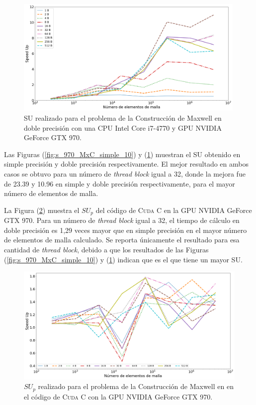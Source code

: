\begin{figure}[htbp]
	\centering
	\includegraphics[width=0.99\textwidth]{figs/cap4/s_970_MxC_double_10}
	\caption{SU realizado para el problema de la Construcción de Maxwell en doble precisión con una CPU Intel Core i7-4770 y GPU NVIDIA GeForce GTX 970.} 
	\label{fig:s_970_MxC_double_10}	
\end{figure}

\newpage

Las Figuras (\ref{fig:s_970_MxC_simple_10}) y (\ref{fig:s_970_MxC_double_10}) muestran el SU obtenido en simple precisión y doble precisión respectivamente. El mejor resultado en ambos casos se obtuvo para un número de \textit{thread block} igual a 32, donde la mejora fue de 23.39 y 10.96 en simple y doble precisión respectivamente, para el mayor número de elementos de malla.

La Figura (\ref{fig:c_970_MxC_cuda_10}) muestra el ${SU}_p$ del código de \textsc{Cuda C} en la GPU NVIDIA GeForce GTX 970. Para un número de \textit{thread block} igual a 32, el tiempo de cálculo en doble precisión es 1,29 veces mayor que en simple precisión en el mayor número de elementos de malla calculado. Se reporta únicamente el resultado para esa cantidad de \textit{thread block}, debido a que los resultados de las Figuras (\ref{fig:s_970_MxC_simple_10}) y (\ref{fig:s_970_MxC_double_10}) indican que es el que tiene un mayor SU.

\begin{figure}[htbp]
	\centering
	\includegraphics[width=\textwidth]{figs/cap4/c_970_MxC_cuda_10}
	\caption{$SU_p$ realizado para el problema de la Construcción de Maxwell en en el código de \textsc{Cuda C} con la GPU NVIDIA GeForce GTX 970.} 
	\label{fig:c_970_MxC_cuda_10}	
\end{figure}




